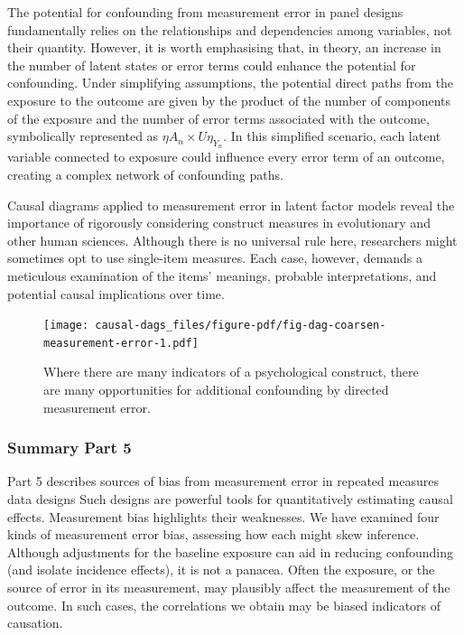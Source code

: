\documentclass[
  singlecolumn]{article}
\begin{document}
The potential for confounding from measurement error in panel designs
fundamentally relies on the relationships and dependencies among
variables, not their quantity. However, it is worth emphasising that, in
theory, an increase in the number of latent states or error terms could
enhance the potential for confounding. Under simplifying assumptions,
the potential direct paths from the exposure to the outcome are given by
the product of the number of components of the exposure and the number
of error terms associated with the outcome, symbolically represented as
\(\eta A_n \times U\eta_{Y_n}\). In this simplified scenario, each
latent variable connected to exposure could influence every error term
of an outcome, creating a complex network of confounding paths.

Causal diagrams applied to measurement error in latent factor models
reveal the importance of rigorously considering construct measures in
evolutionary and other human sciences. Although there is no universal
rule here, researchers might sometimes opt to use single-item measures.
Each case, however, demands a meticulous examination of the items'
meanings, probable interpretations, and potential causal implications
over time.

\begin{figure}

{\centering \texttt{[image: causal-dags\_files/figure-pdf/fig-dag-coarsen-measurement-error-1.pdf]}

}

\caption{\label{fig-dag-coarsen-measurement-error}Where there are many
indicators of a psychological construct, there are many opportunities
for additional confounding by directed measurement error.}

\end{figure}

\hypertarget{summary-part-5}{%
\subsubsection{Summary Part 5}\label{summary-part-5}}

Part 5 describes sources of bias from measurement error in repeated
measures data designs Such designs are powerful tools for quantitatively
estimating causal effects. Measurement bias highlights their weaknesses.
We have examined four kinds of measurement error bias, assessing how
each might skew inference. Although adjustments for the baseline
exposure can aid in reducing confounding (and isolate incidence
effects), it is not a panacea. Often the exposure, or the source of
error in its measurement, may plausibly affect the measurement of the
outcome. In such cases, the correlations we obtain may be biased
indicators of causation.
\end{document}
